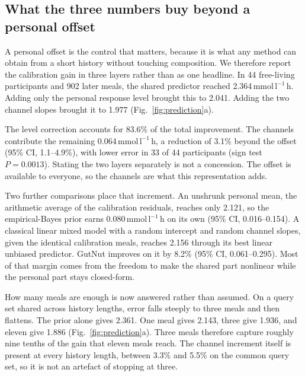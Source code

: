 \documentclass[pdflatex,sn-nature]{sn-jnl}
\newcommand{\aucunit}{\mathrm{mmol\,l^{-1}\,h}}
\theoremstyle{thmstyleone}
\theoremstyle{thmstyletwo}
\theoremstyle{thmstylethree}
\begin{document}
\subsection{What the three numbers buy beyond a personal offset}

A personal offset is the control that matters, because it is what any method can obtain from a short history without touching composition. We therefore report the calibration gain in three layers rather than as one headline. In 44 free-living participants and 902 later meals, the shared predictor reached 2.364\,$\aucunit$. Adding only the personal response level brought this to 2.041. Adding the two channel slopes brought it to 1.977 (Fig.~\ref{fig:prediction}a).

The level correction accounts for 83.6\% of the total improvement. The channels contribute the remaining 0.064\,$\aucunit$, a reduction of 3.1\% beyond the offset (95\% CI, 1.1--4.9\%), with lower error in 33 of 44 participants (sign test $P=0.0013$). Stating the two layers separately is not a concession. The offset is available to everyone, so the channels are what this representation adds.

Two further comparisons place that increment. An unshrunk personal mean, the arithmetic average of the calibration residuals, reaches only 2.121, so the empirical-Bayes prior earns 0.080\,$\aucunit$ on its own (95\% CI, 0.016--0.154). A classical linear mixed model with a random intercept and random channel slopes, given the identical calibration meals, reaches 2.156 through its best linear unbiased predictor. GutNut improves on it by 8.2\% (95\% CI, 0.061--0.295). Most of that margin comes from the freedom to make the shared part nonlinear while the personal part stays closed-form.

How many meals are enough is now answered rather than assumed. On a query set shared across history lengths, error falls steeply to three meals and then flattens. The prior alone gives 2.361. One meal gives 2.143, three give 1.936, and eleven give 1.886 (Fig.~\ref{fig:prediction}a). Three meals therefore capture roughly nine tenths of the gain that eleven meals reach. The channel increment itself is present at every history length, between 3.3\% and 5.5\% on the common query set, so it is not an artefact of stopping at three.
\end{document}
